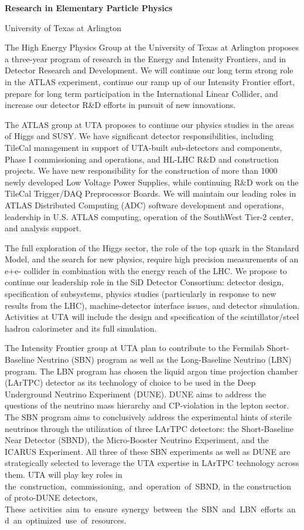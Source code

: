 
\begin{center}
\Large\textbf{Research in Elementary Particle Physics}

University of Texas at Arlington
\end{center}

The High Energy Physics Group at the University of Texas at Arlington proposes a three-year program of research in the Energy and Intensity Frontiers, 
and in Detector Research and Development. We will continue our long term strong role in the ATLAS experiment, continue our ramp up of our Intensity Frontier 
effort, prepare for long term participation in the International Linear Collider, and increase our detector R$\&$D efforts in pursuit of new innovations.

The ATLAS group at UTA proposes to continue our physics studies in the areas of Higgs and SUSY. We have significant detector responsibilities, including 
TileCal management in support of UTA-built sub-detectors and components, Phase I commissioning and operations, and HL-LHC R$\&$D and construction projects. 
We have new responsibility for the construction of more than 1000 newly developed Low Voltage Power Supplies, while continuing R$\&$D work on the TileCal 
Trigger/DAQ Preprocessor Boards. We will maintain our leading roles in ATLAS Distributed Computing (ADC) software development and operations, leadership 
in U.S. ATLAS computing, operation of the SouthWest Tier-2 center, and analysis support. 

The full exploration of the Higgs sector, the role of the top quark in the Standard Model, and the search for new physics, require high precision measurements 
of an e+e- collider in combination with the energy reach of the LHC. We propose to continue our leadership role in the SiD Detector Consortium: detector design, 
specification of subsystems, physics studies (particularly in response to new results from the LHC), machine-detector interface issues, and detector simulation. 
Activities at UTA will include the design and specification of the scintillator/steel hadron calorimeter and its full simulation. 

The Intensity Frontier group at UTA plan to contribute to the Fermilab Short-Baseline Neutrino (SBN) program as well as the Long-Baseline Neutrino (LBN) program. 
The LBN program has chosen the liquid argon time projection chamber (LArTPC) detector as its technology of choice to be used in the Deep Underground Neutrino 
Experiment (DUNE).  DUNE aims to address the questions of the neutrino mass hierarchy and CP-violation in the lepton sector. The SBN program aims to conclusively 
address the experimental hints of sterile neutrinos through the utilization of three LArTPC detectors: the Short-Baseline Near Detector (SBND), the Micro-Booster
 Neutrino Experiment, and the ICARUS Experiment. All three of these SBN experiments as well as DUNE are strategically selected to leverage the UTA expertise in 
 LArTPC technology across them. UTA will play key roles in the construction, commissioning, and operation of SBND, in the construction of proto-DUNE detectors,
These activities aim to ensure synergy between the SBN and LBN efforts and an optimized use of resources. 

